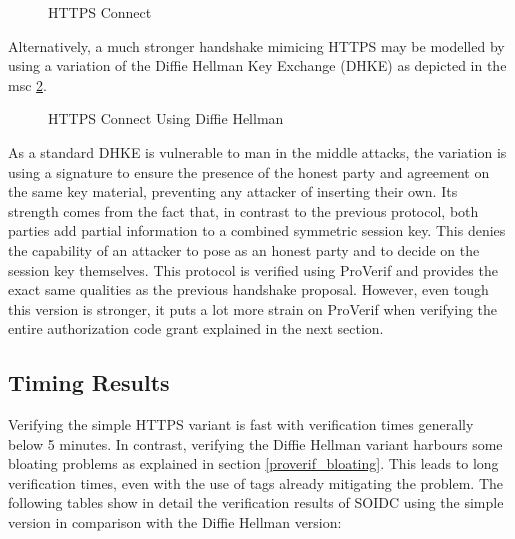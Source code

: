 \documentclass[11pt,twoside,a4paper,openright]{book}
\begin{document}
\begin{figure}[H]
    \centering
    
    \caption{HTTPS Connect}
    \label{fig:msc_https}
\end{figure}

Alternatively, a much stronger handshake mimicing HTTPS may be modelled by using a variation of the Diffie Hellman Key Exchange (DHKE) as depicted in the msc \ref{fig:msc_https_dh}. 

\begin{figure}[H]
    \centering
    
    \caption{HTTPS Connect Using Diffie Hellman}
    \label{fig:msc_https_dh}
\end{figure}

As a standard DHKE is vulnerable to man in the middle attacks, the variation is using a signature to ensure the presence of the honest party and agreement on the same key material, preventing any attacker of inserting their own. Its strength comes from the fact that, in contrast to the previous protocol, both parties add partial information to a combined symmetric session key. This denies the capability of an attacker to pose as an honest party and to decide on the session key themselves. This protocol is verified using ProVerif and provides the exact same qualities as the previous handshake proposal. However, even tough this version is stronger, it puts a lot more strain on ProVerif when verifying the entire authorization code grant explained in the next section. 

\subsection{Timing Results}

Verifying the simple HTTPS variant is fast with verification times generally below 5 minutes. In contrast, verifying the Diffie Hellman variant harbours some bloating problems as explained in section \ref{proverif_bloating}. This leads to long verification times, even with the use of tags already mitigating the problem. The following tables show in detail the verification results of SOIDC using the simple version in comparison with the Diffie Hellman version:

    \begin{table}[H]
        \centering
        \def\arraystretch{1.5}
    \end{table}
\end{document}
